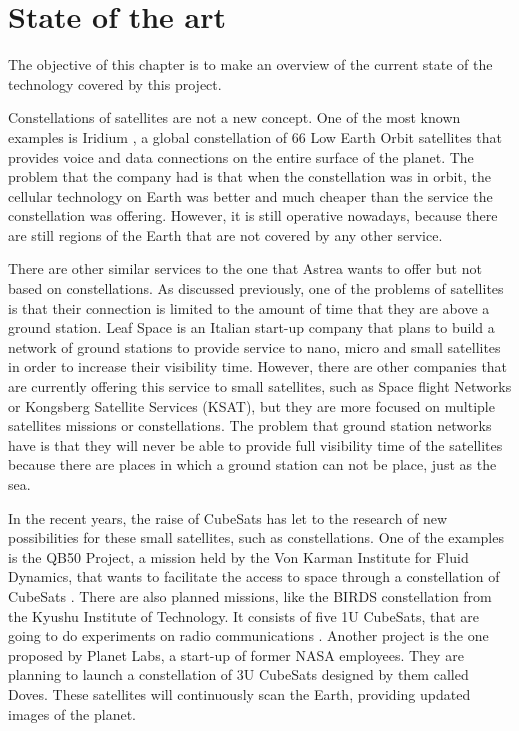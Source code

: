 \chapter{State of the art}
The objective of this chapter is to make an overview of the current state of the technology covered by this project. 

Constellations of satellites are not a new concept. One of the most known examples is Iridium \cite{Iridium}, a global constellation of 66 Low Earth Orbit satellites that provides voice and data connections on the entire surface of the planet. The problem that the company had is that when the constellation was in orbit, the cellular technology on Earth was better and much cheaper than the service the constellation was offering. However, it is still operative nowadays, because there are still regions of the Earth that are not covered by any other service.

There are other similar services to the one that Astrea wants to offer but not based on constellations. As discussed previously, one of the problems of satellites is that their connection is limited to the amount of time that they are above a ground station. Leaf Space is an Italian start-up company that plans to build a network of ground stations to provide service to nano, micro and small satellites in order to increase their visibility time. However, there are other companies that are currently offering this service to small satellites, such as Space flight Networks or Kongsberg Satellite Services (KSAT), but they are more focused on multiple satellites missions or constellations. The problem that ground station networks have is that they will never be able to provide full visibility time of the satellites because there are places in which a ground station can not be place, just as the sea.

In the recent years, the raise of CubeSats has let to the research of new possibilities for these small satellites, such as constellations. One of the examples is the QB50 Project, a mission held by the Von Karman Institute for Fluid Dynamics, that wants to facilitate the access to space through a constellation of CubeSats \cite{qb50}. There are also planned missions, like the BIRDS constellation from the Kyushu Institute of Technology. It consists of five 1U CubeSats, that are going to do experiments on radio communications \cite{KyushuInstituteofTechnology2017}. Another project is the one proposed by Planet Labs, a start-up of former NASA employees. They are planning to launch a constellation of 3U CubeSats designed by them called Doves. These satellites will continuously scan the Earth, providing updated images of the planet.

